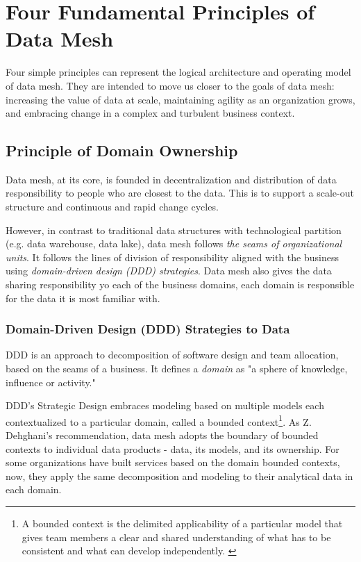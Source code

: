 \documentclass[12pt, a4paper]{book}
\begin{document}
\section{Four Fundamental Principles of Data Mesh}\label{4principles}
Four simple principles can represent the logical architecture and operating model of data mesh. They are intended to move us closer to the goals of data mesh: increasing the value of data at scale, maintaining agility as an organization grows, and embracing change in a complex and turbulent business context.

\subsection{Principle of Domain Ownership}
Data mesh, at its core, is founded in decentralization and distribution of data responsibility to people who are closest to the data. This is to support a scale-out structure and continuous and rapid change cycles.

However, in contrast to traditional data structures with technological partition (e.g. data warehouse, data lake), data mesh follows \textit{the seams of organizational units}. It follows the lines of division of responsibility aligned with the business using \textit{domain-driven design (DDD) strategies}. Data mesh also gives the data sharing responsibility yo each of the business domains, each domain is responsible for the data it is most familiar with.

\subsubsection*{Domain-Driven Design (DDD) Strategies to Data}
DDD is an approach to decomposition of software design and team allocation, based on the seams of a business. It defines a \textit{domain} as "a sphere of knowledge, influence or activity."

DDD’s Strategic Design embraces modeling based on multiple models each contextualized to a particular domain, called a bounded context\footnote{A bounded context is the delimited applicability of a particular model that gives team members a clear and shared understanding of what has to be consistent and what can develop independently. \cite{dddevan}}. As Z. Dehghani's recommendation, data mesh adopts the boundary of bounded contexts to individual data products - data, its models, and its ownership. For some organizations have built services based on the domain bounded contexts, now, they apply the same decomposition and modeling to their analytical data in each domain.
\end{document}
